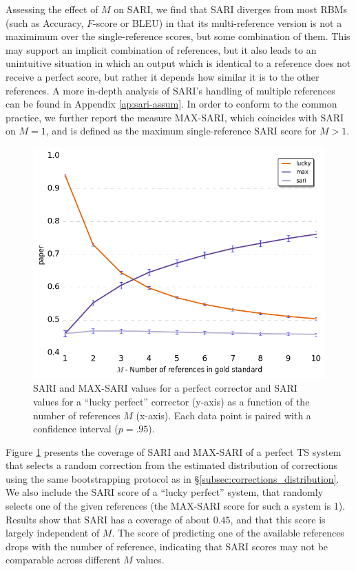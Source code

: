 \documentclass[letterpaper, 11pt]{article}
\begin{document}
Assessing the effect of $M$ on SARI, we find that SARI diverges from most RBMs (such as Accuracy, $F$-score or BLEU) 
in that its multi-reference version is not a maximimum over the single-reference scores, but some combination of them.
This may support an implicit combination of references, but it also leads to an unintuitive situation in which an output
which is identical to a reference does not receive a perfect score, but rather it depends how similar it is to the other
references. A more in-depth analysis of SARI's handling of multiple references can be found in Appendix \ref{ap:sari-assum}.
In order to conform to the common practice, we further report the measure MAX-SARI, which coincides with SARI on $M=1$, 
and is defined as the maximum single-reference SARI score for $M>1$.

\begin{figure}
	\includegraphics[width=0.9\columnwidth]{lucky,max,paper_Ms_significance}
	\caption{
		SARI and MAX-SARI values for a perfect corrector and SARI values for a ``lucky perfect'' corrector (y-axis) as a function of the number of references $M$ (x-axis).
		Each data point is paired with a confidence interval ($p=.95$).\label{fig:SARI_Ms}}
	\vspace{-0.5cm}
\end{figure}

Figure \ref{fig:SARI_Ms} presents the coverage of SARI and MAX-SARI of a perfect TS system that selects a random correction
from the estimated distribution of corrections using the same bootstrapping protocol as in \S\ref{subsec:corrections_distribution}.
We also include the SARI score of a ``lucky perfect'' system, that randomly selects one of 
the given references (the MAX-SARI score for such a system is 1). 
Results show that SARI has a coverage of about $0.45$, and that this score is largely independent of $M$.
The score of predicting one of the available references drops with the number of reference, indicating that SARI scores may not be comparable
across different $M$ values. 
\end{document}
